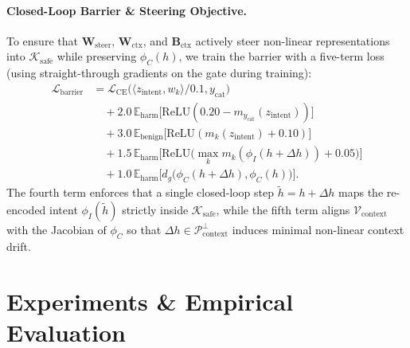 \documentclass[11pt,twocolumn,a4paper]{article}
\begin{document}
\paragraph{Closed-Loop Barrier \& Steering Objective.}
To ensure that $\mathbf{W}_{\text{steer}}$, $\mathbf{W}_{\text{ctx}}$, and $\mathbf{B}_{\text{ctx}}$ actively steer non-linear representations into $\mathcal{K}_{\text{safe}}$ while preserving $\phi_C(h)$, we train the barrier with a five-term loss (using straight-through gradients on the gate during training):
\begin{align}
    \mathcal{L}_{\text{barrier}} &= \mathcal{L}_{\text{CE}}\big(\langle z_{\text{intent}}, w_k \rangle / 0.1, y_{\text{cat}}\big) \nonumber \\
    &\quad + 2.0\,\mathbb{E}_{\text{harm}}\big[\mathrm{ReLU}(0.20 - m_{y_{\text{cat}}}(z_{\text{intent}}))\big] \nonumber \\
    &\quad + 3.0\,\mathbb{E}_{\text{benign}}\big[\mathrm{ReLU}(m_k(z_{\text{intent}}) + 0.10)\big] \nonumber \\
    &\quad + 1.5\,\mathbb{E}_{\text{harm}}\Big[\mathrm{ReLU}\big(\max_k m_k(\phi_I(h + \Delta h)) + 0.05\big)\Big] \nonumber \\
    &\quad + 1.0\,\mathbb{E}_{\text{harm}}\Big[d_g\big(\phi_C(h + \Delta h), \phi_C(h)\big)\Big].
    \label{eq:barrier_loss}
\end{align}
The fourth term enforces that a single closed-loop step $\tilde{h} = h + \Delta h$ maps the re-encoded intent $\phi_I(\tilde{h})$ strictly inside $\mathcal{K}_{\text{safe}}$, while the fifth term aligns $\mathcal{V}_{\text{context}}$ with the Jacobian of $\phi_C$ so that $\Delta h \in \mathcal{P}_{\text{context}}^\perp$ induces minimal non-linear context drift.

\section{Experiments \& Empirical Evaluation}
\label{sec:experiments}
\end{document}
